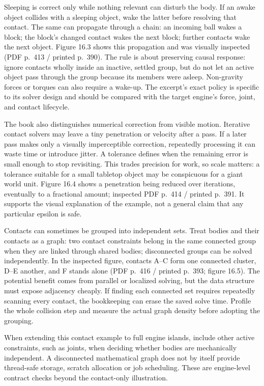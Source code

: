 Sleeping is correct only while nothing relevant can disturb the body. If an awake object collides with a sleeping object, wake the latter before resolving that contact. The same can propagate through a chain: an incoming ball wakes a block; the block's changed contact wakes the next block; further contacts wake the next object. Figure 16.3 shows this propagation and was visually inspected (PDF p.~413 / printed p.~390). The rule is about preserving causal response: ignore contacts wholly inside an inactive, settled group, but do not let an active object pass through the group because its members were asleep. Non-gravity forces or torques can also require a wake-up. The excerpt's exact policy is specific to its solver design and should be compared with the target engine's force, joint, and contact lifecycle.

The book also distinguishes numerical correction from visible motion. Iterative contact solvers may leave a tiny penetration or velocity after a pass. If a later pass makes only a visually imperceptible correction, repeatedly processing it can waste time or introduce jitter. A tolerance defines when the remaining error is small enough to stop revisiting. This trades precision for work, so scale matters: a tolerance suitable for a small tabletop object may be conspicuous for a giant world unit. Figure 16.4 shows a penetration being reduced over iterations, eventually to a fractional amount; inspected PDF p.~414 / printed p.~391. It supports the visual explanation of the example, not a general claim that any particular epsilon is safe.

Contacts can sometimes be grouped into independent sets. Treat bodies and their contacts as a graph: two contact constraints belong in the same connected group when they are linked through shared bodies; disconnected groups can be solved independently. In the inspected figure, contacts A--C form one connected cluster, D--E another, and F stands alone (PDF p.~416 / printed p.~393; figure 16.5). The potential benefit comes from parallel or localized solving, but the data structure must expose adjacency cheaply. If finding each connected set requires repeatedly scanning every contact, the bookkeeping can erase the saved solve time. Profile the whole collision step and measure the actual graph density before adopting the grouping.

When extending this contact example to full engine islands, include other active constraints, such as joints, when deciding whether bodies are mechanically independent. A disconnected mathematical graph does not by itself provide thread-safe storage, scratch allocation or job scheduling. These are engine-level contract checks beyond the contact-only illustration.


